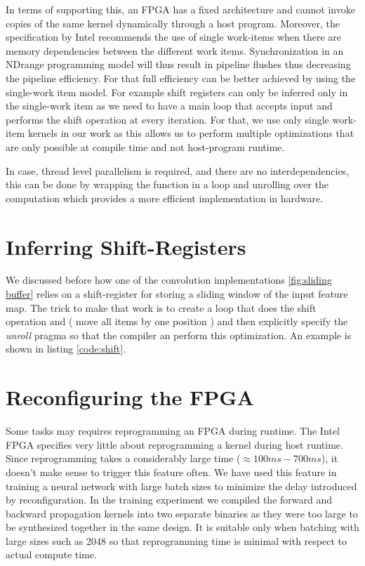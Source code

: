 In terms of supporting this, an FPGA has a fixed architecture and cannot invoke copies of the same kernel dynamically through a host program. Moreover, the specification by Intel recommends the use of single work-items when there are memory dependencies between the different work items. Synchronization in an NDrange programming model will thus result in pipeline flushes thus decreasing the pipeline efficiency. For that full efficiency can be better achieved by using the single-work item model. For example shift registers can only be inferred only in the single-work item as we need to have a main loop that accepts input and performs the shift operation at every iteration. For that, we use only single work-item kernels in our work as this allows us to perform multiple optimizations that are only possible at compile time and not host-program runtime. 

In case, thread level parallelism is required, and there are no interdependencies, this can be done by wrapping the function in a loop and unrolling over the computation which provides a more efficient implementation in hardware. 

\section{Inferring Shift-Registers} \label{shiftinf}

We discussed before how one of the convolution implementations \ref{fig:sliding buffer} relies on a shift-register for storing a sliding window of the input feature map. The trick to make that work is to create a loop that does the shift operation and ( move all items by one position ) and then explicitly specify the \emph{unroll} pragma so that the compiler an perform this optimization. An example is shown in listing \ref{code:shift}.

\newpage

 \label{code:shift} 

\section{Reconfiguring the FPGA}

Some tasks may requires reprogramming an FPGA during runtime. The Intel FPGA specifies very little about reprogramming a kernel during host runtime. Since reprogramming takes a considerably large time ($\approx100ms-700ms $), it doesn’t make sense to trigger this feature often. We have used this feature in training a neural network with large batch sizes to minimize the delay introduced by reconfiguration. In the training experiment we compiled the forward and backward propagation kernels into two separate binaries as they were too large to be synthesized together in the same design. It is suitable only when batching with large sizes such as 2048 so that reprogramming time is minimal with respect to actual compute time. 


